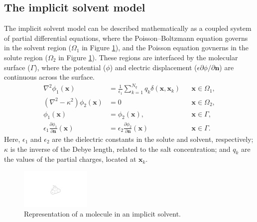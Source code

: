 \subsection*{\sffamily \large The implicit solvent model}

The implicit solvent model\cite{RouxSimonson1999,DecherchiETal2015} can be described mathematically as a coupled system of partial differential equations, where the Poisson--Boltzmann equation governs in the solvent region ($\Omega_1$ in Figure \ref{fig:implicit_molecule}), and the Poisson equation govnerns in the solute region ($\Omega_2$ in Figure \ref{fig:implicit_molecule}). These regions are interfaced by the molecular surface ($\Gamma$), where the potential ($\phi$) and electric displacement ($\epsilon\partial\phi/\partial\mathbf{n}$) are continuous across the surface.
%
\begin{subequations}
\label{eq:pbe}
\begin{align}
\nabla^2\phi_1(\mathbf{x}) &= \tfrac{1}{\epsilon_1}\sum_{k=1}^{N_q} q_k\delta(\mathbf{x},\mathbf{x}_k)&&\mathbf{x} \in \Omega_1,\label{eq:pbe1}\\
\left(\nabla^2 - \kappa^2\right)\phi_2(\mathbf{x})  &= 0&&\mathbf{x}\in\Omega_2,\label{eq:pbe2}\\
\phi_1(\mathbf{x})  &= \phi_2 (\mathbf{x}),&&\mathbf{x}\in \Gamma,\label{eq:pbe3}\\
\epsilon_1\frac{\partial\phi_1}{\partial\mathbf{n}}(\mathbf{x}) &= \epsilon_2\frac{\partial\phi_2}{\partial\mathbf{n}}(\mathbf{x})&&\mathbf{x}\in \Gamma. \label{eq:pbe4}
\end{align}
\end{subequations}
%
Here, $\epsilon_1$ and $\epsilon_2$ are the dielectric constants in the solute and solvent, respectively; $\kappa$ is the inverse of the Debye length, related to the salt concentration; and $q_k$ are the values of the partial charges, located at $\mathbf{x}_k$.

\begin{figure}
\centering
\includegraphics[width=0.3\textwidth]{implicit_molecule.pdf}
\caption{Representation of a molecule in an implicit solvent.}
\label{fig:implicit_molecule}
\end{figure}

